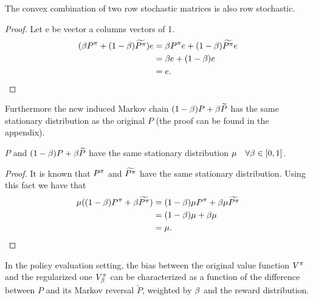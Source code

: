 \begin{lemma}
\label{lem:stochastic_matrix_convex_combination}
The convex combination of two row stochastic matrices is also row stochastic.
\end{lemma}
\begin{proof}
Let e be vector a columns vectors of 1.
\begin{equation}
\begin{split}
       (\beta P^{\pi} + (1-\beta) \widetilde{P^{\pi}})e &= \beta P^{\pi}e +  (1-\beta) \widetilde{P^{\pi}}e \\
       &= \beta e + (1-\beta) e\\
       &= e.
\end{split}
\end{equation}
\end{proof}
Furthermore the new induced Markov chain $(1-\beta) P + \beta \widetilde{P}$ has the same stationary distribution as the original $P$ (the proof can be found in the appendix).

\begin{lemma}
\label{cor:same_stationary_dist}
$P$ and $(1-\beta) P + \beta \widetilde{P}$ have the same stationary distribution $\mu \quad \forall \beta \in [0,1]$.
\end{lemma}
\begin{proof}
It is known that $P^{\pi}$ and $\widetilde{P^{\pi}}$ have the same stationary distribution. Using this fact we have that
\begin{equation}
    \begin{split}
        \mu( (1-\beta) P^{\pi} + \beta \widetilde{P^{\pi}}) &=  (1-\beta) \mu P^{\pi} + \beta \mu \widetilde{P^{\pi}} \\
        &= (1-\beta)\mu + \beta \mu\\
        &= \mu.
    \end{split}
\end{equation}
\end{proof} 


In the policy evaluation setting, the bias between the original value function $V^{\pi}$ and the regularized one $V^{\pi}_{\beta}$ can be characterized as a function of the difference between $P$ and its Markov reversal $\widetilde{P}$, weighted by $\beta$ and the reward distribution.


